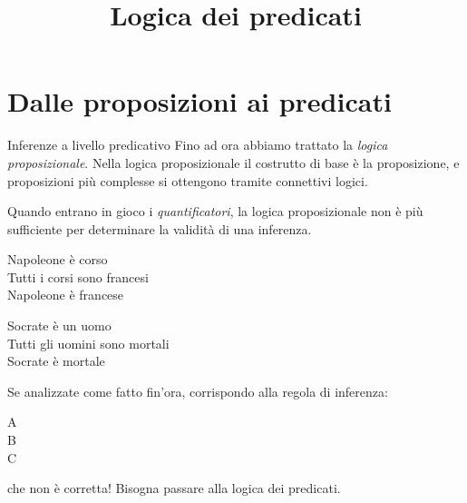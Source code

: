 \documentclass[aspectratio=169,10pt,dvipsnames,xcolor=table,handout]{beamer}
\title{Logica dei predicati}
\begin{document}
\begin{frame}
    \titlepage
\end{frame}

\section{Dalle proposizioni ai predicati}

\begin{frame}{Inferenze a livello predicativo}
    Fino ad ora abbiamo trattato la \emph{logica proposizionale}. Nella logica proposizionale il costrutto di base è la proposizione, e proposizioni più complesse si ottengono tramite connettivi logici.

    \medskip
    Quando entrano in gioco i \emph{quantificatori}, la logica proposizionale non è più sufficiente per determinare la validità di una inferenza.

    \begin{center}
        \begin{inference}
            Napoleone è corso\\
            Tutti i corsi sono francesi\\
            \hline
            Napoleone è francese
        \end{inference}
        \qquad
        \begin{inference}
            Socrate è un uomo\\
            Tutti gli uomini sono mortali\\
            \hline
            Socrate è mortale
        \end{inference}
    \end{center}
    Se analizzate come fatto fin'ora, corrispondo alla regola di inferenza:
    \begin{center}
        \begin{inference}
            A\\
            B\\
            \hline
            C
        \end{inference}
    \end{center}
    che non è corretta! Bisogna passare alla \alert{logica dei predicati}.
\end{frame}
\end{document}
